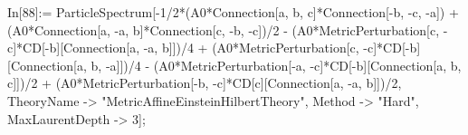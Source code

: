 In[88]:= ParticleSpectrum[-1/2*(A0*Connection[a, b, c]*Connection[-b, -c, -a]) + (A0*Connection[a, -a, b]*Connection[c, -b, -c])/2 - (A0*MetricPerturbation[c, -c]*CD[-b][Connection[a, -a, b]])/4 + (A0*MetricPerturbation[c, -c]*CD[-b][Connection[a, b, -a]])/4 - (A0*MetricPerturbation[-a, -c]*CD[-b][Connection[a, b, c]])/2 + (A0*MetricPerturbation[-b, -c]*CD[c][Connection[a, -a, b]])/2, TheoryName -> "MetricAffineEinsteinHilbertTheory", Method -> "Hard", MaxLaurentDepth -> 3]; 